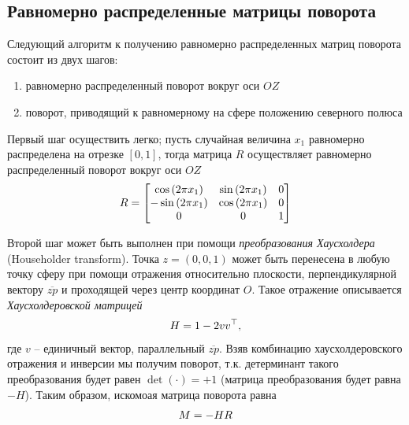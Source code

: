 \subsection{Равномерно распределенные матрицы поворота}

Следующий алгоритм к получению равномерно распределенных матриц поворота состоит из двух шагов:
\begin{enumerate}
\item равномерно распределенный поворот вокруг оси $OZ$
\item поворот, приводящий к равномерному на сфере положению северного полюса
\end{enumerate} 

Первый шаг осуществить легко; пусть случайная величина $x_1$ равномерно распределена на отрезке $[0, 1]$, тогда матрица $R$ осуществляет равномерно распределенный поворот вокруг оси $OZ$ 
\begin{gather}
R =
\begin{bmatrix}
\cos \left( 2 \pi x_1 \right) & \sin \left( 2 \pi x_1 \right) & 0 \\
- \sin \left( 2 \pi x_1 \right) & \cos \left( 2 \pi x_1 \right) & 0 \\
0 & 0 & 1
\end{bmatrix} \label{rmatrix} 
\end{gather}

Второй шаг может быть выполнен при помощи \textit{преобразования Хаусхолдера} (Householder transform). Точка $z = (0, 0, 1)$  может быть перенесена в любую точку сферу при помощи отражения относительно плоскости, перпендикулярной вектору $\overline{zp}$ и проходящей через центр координат $O$. Такое отражение описывается \textit{Хаусхолдеровской матрицей}
\begin{gather}
		H = 1 - 2 v v^\top, \notag
\end{gather}
где $v$ -- единичный вектор, параллельный $\overline{zp}$. Взяв комбинацию хаусхолдеровского отражения и инверсии мы получим поворот, т.к. детерминант такого преобразования будет равен $\det(\cdot) = + 1$ (матрица преобразования будет равна $-H$). Таким образом, искомоая матрица поворота равна
\begin{gather}
		M = - HR \notag
\end{gather}

